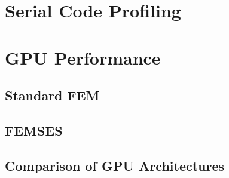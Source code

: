 \section{Serial Code Profiling}

\section{GPU Performance}

\subsection{Standard FEM}

\subsection{FEMSES}

\subsection{Comparison of GPU Architectures}